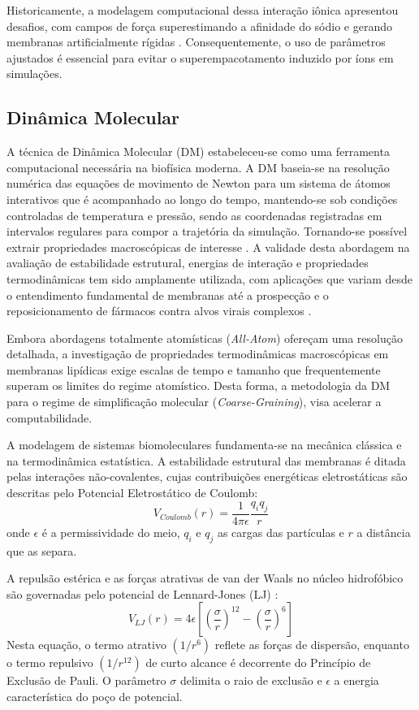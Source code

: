 Historicamente, a modelagem computacional dessa interação iônica apresentou desafios, com campos de força superestimando a afinidade do sódio e gerando membranas artificialmente rígidas \cite{melcr2018}. Consequentemente, o uso de parâmetros ajustados é essencial para evitar o superempacotamento induzido por íons em simulações.

\subsection{Dinâmica Molecular}

A técnica de Dinâmica Molecular (DM) estabeleceu-se como uma ferramenta computacional necessária na biofísica moderna. A DM baseia-se na resolução numérica das equações de movimento de Newton para um sistema de átomos interativos que é acompanhado ao longo do tempo, mantendo-se sob condições controladas de temperatura e pressão, sendo as coordenadas registradas em intervalos regulares para compor a trajetória da simulação. Tornando-se possível extrair propriedades macroscópicas de interesse \cite{gromacs2024}. A validade desta abordagem na avaliação de estabilidade estrutural, energias de interação e propriedades termodinâmicas tem sido amplamente utilizada, com aplicações que variam desde o entendimento fundamental de membranas até a prospecção e o reposicionamento de fármacos contra alvos virais complexos \cite{cardoso2021, colherinhas2025}.

Embora abordagens totalmente atomísticas (\textit{All-Atom}) ofereçam uma resolução detalhada, a investigação de propriedades termodinâmicas macroscópicas em membranas lipídicas exige escalas de tempo e tamanho que frequentemente superam os limites do regime atomístico. Desta forma, a metodologia da DM para o regime de simplificação molecular (\textit{Coarse-Graining}), visa acelerar a computabilidade.

A modelagem de sistemas biomoleculares fundamenta-se na mecânica clássica e na termodinâmica estatística. A estabilidade estrutural das membranas é ditada pelas interações não-covalentes, cujas contribuições energéticas eletrostáticas são descritas pelo Potencial Eletrostático de Coulomb:
\begin{equation}
    V_{Coulomb}(r) = \frac{1}{4\pi\epsilon}\frac{q_i q_j}{r}
\end{equation}
onde $\epsilon$ é a permissividade do meio, $q_i$ e $q_j$ as cargas das partículas e $r$ a distância que as separa.

A repulsão estérica e as forças atrativas de van der Waals no núcleo hidrofóbico são governadas pelo potencial de Lennard-Jones (LJ) \cite{lenhard2024history}:
\begin{equation}
    V_{LJ}(r) = 4\epsilon \left[ \left(\frac{\sigma}{r}\right)^{12} - \left(\frac{\sigma}{r}\right)^6 \right]
\end{equation}
Nesta equação, o termo atrativo $(1/r^6)$ reflete as forças de dispersão, enquanto o termo repulsivo $(1/r^{12})$ de curto alcance é decorrente do Princípio de Exclusão de Pauli. O parâmetro $\sigma$ delimita o raio de exclusão e $\epsilon$ a energia característica do poço de potencial.

